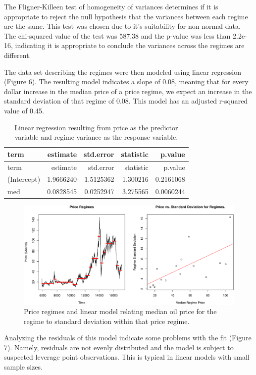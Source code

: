 \documentclass[]{article}
\begin{document}
The Fligner-Killeen test of homogeneity of variances determines if it is
appropriate to reject the null hypothesis that the variances between
each regime are the same. This test was chosen due to it's suitability
for non-normal data. The chi-squared value of the test was 587.38 and
the p-value was less than 2.2e-16, indicating it is appropriate to
conclude the variances across the regimes are different.

The data set describing the regimes were then modeled using linear
regression (Figure 6). The resulting model indicates a slope of 0.08,
meaning that for every dollar increase in the median price of a price
regime, we expect an increase in the standard deviation of that regime
of 0.08. This model has an adjusted r-squared value of 0.45.

\begin{longtable}[]{@{}lrrrr@{}}
\caption{Linear regression resulting from price as the predictor
variable and regime variance as the response variable.}\tabularnewline
\toprule
term & estimate & std.error & statistic & p.value\tabularnewline
\midrule
\endfirsthead
\toprule
term & estimate & std.error & statistic & p.value\tabularnewline
\midrule
\endhead
(Intercept) & 1.9666240 & 1.5125362 & 1.300216 &
0.2161068\tabularnewline
med & 0.0828545 & 0.0252947 & 3.275565 & 0.0060244\tabularnewline
\bottomrule
\end{longtable}

\begin{figure}[htbp]
\centering
\includegraphics{Figs/unnamed-chunk-17-1.pdf}
\caption{Price regimes and linear model relating median oil price for
the regime to standard deviation within that price regime.}
\end{figure}

Analyzing the residuals of this model indicate some problems with the
fit (Figure 7). Namely, residuals are not evenly distributed and the
model is subject to suspected leverage point observations. This is
typical in linear models with small sample sizes.
\end{document}
